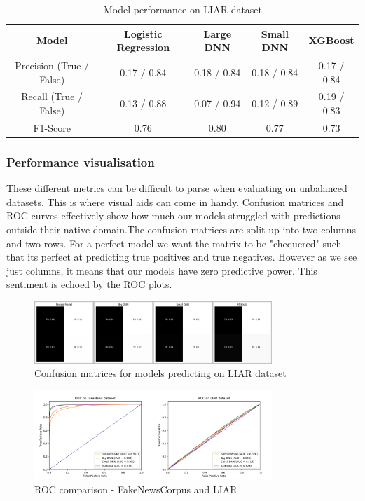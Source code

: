 \begin{table}[htpb]
  \centering
  \caption{Model performance on LIAR dataset}
  \label{tab:liarperformance}
  \begin{tabular}{c|cccc}
    Model & Logistic Regression & Large DNN & Small DNN & XGBoost \\ \hline
    Precision (True / False) & 0.17 / 0.84  & 0.18 / 0.84 & 0.18 / 0.84 & 0.17 / 0.84 \\ \hline
    Recall (True / False) & 0.13 / 0.88 & 0.07 / 0.94 & 0.12 / 0.89 & 0.19 / 0.83 \\ \hline
    F1-Score& 0.76 & 0.80 & 0.77 & 0.73 \\
  \end{tabular}
\end{table}

\subsubsection{Performance visualisation}
These different metrics can be difficult to parse when evaluating on unbalanced datasets. This is where visual aids can
come in handy. Confusion matrices and ROC curves effectively show how much our models struggled with predictions outside
their native domain.The confusion matrices are split up into two columns and two rows. For a perfect model we want the
matrix to be "chequered" such that its perfect at predicting true positives and true negatives. However as we see just
columns, it means that our models have zero predictive power. This sentiment is echoed by the ROC plots.

\begin{figure}[htpb]
  \centering
  \includegraphics[width=0.8\textwidth]{figures/matrix_combined}
  \caption{Confusion matrices for  models predicting on LIAR dataset}
  \label{fig:conf_mat}
\end{figure}
\begin{figure}[htpb]
  \centering
  \includegraphics[width=0.8\textwidth]{figures/ROC_combined}
  \caption{ROC comparison - FakeNewsCorpus and LIAR}
  \label{fig:roc}
\end{figure}


